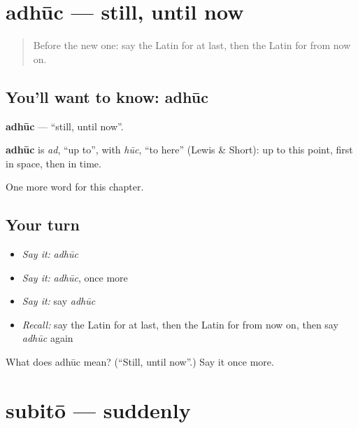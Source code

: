 \section[adhūc]{adhūc — still, until now}

\label{lesson:LA-C175-adhuc}



\begin{quote}
Before the new one: say the Latin for at last, then the Latin for from now on.
\end{quote}

\subsection*{You'll want to know: adhūc}
\textbf{adhūc} — \textquotedblleft{}still, until now\textquotedblright{}.

\begin{cousinweb}
\textbf{adhūc} is \emph{ad}, \textquotedblleft{}up to\textquotedblright{}, with \emph{hūc}, \textquotedblleft{}to here\textquotedblright{} (Lewis \& Short): up to this point, first in space, then in time.
\end{cousinweb}

\begin{grammarlens}[title={What you've built}]
One more word for this chapter.
\end{grammarlens}

\subsection*{Your turn}
\begin{itemize}
\raggedright
  \item \emph{Say it:} \emph{adhūc}
  \item \emph{Say it:} \emph{adhūc}, once more
  \item \emph{Say it:} say \emph{adhūc}
  \item \emph{Recall:} say the Latin for at last, then the Latin for from now on, then say \emph{adhūc} again
\end{itemize}

\begin{tcolorbox}[breakable,colback=teal!4,colframe=teal!35!black,title={Before you move on}]
What does adhūc mean? (\textquotedblleft{}Still, until now\textquotedblright{}.) Say it once more.
\end{tcolorbox}
\section[subitō]{subitō — suddenly}


